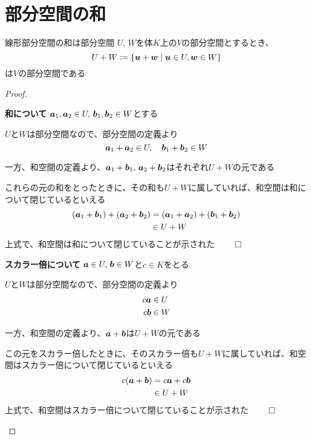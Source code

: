 \documentclass[../../../topic_linear-algebra]{subfiles}
\begin{document}
\sectionline
\section{部分空間の和}

\begin{theorem}{線形部分空間の和は部分空間}
  $U,\,W$を体$K$上の$V$の部分空間とするとき、
  \begin{equation*}
    U + W \coloneq \{ \vb*{u} + \vb*{w} \mid \vb*{u} \in U, \vb*{w} \in W \}
  \end{equation*}
  は$V$の部分空間である
\end{theorem}

\begin{proof}
  \begin{subpattern}{\bfseries 和について}
    $\vb*{a}_1, \vb*{a}_2 \in U, \, \vb*{b}_1, \vb*{b}_2 \in W$とする

    $U$と$W$は部分空間なので、部分空間の定義より
    \begin{equation*}
      \vb*{a}_1 + \vb*{a}_2 \in U, \quad \vb*{b}_1 + \vb*{b}_2 \in W
    \end{equation*}

    一方、和空間の定義より、$\vb*{a}_1 + \vb*{b}_1,\, \vb*{a}_2 + \vb*{b}_2$はそれぞれ$U+W$の元である

    これらの元の和をとったときに、その和も$U + W$に属していれば、和空間は和について閉じているといえる
    \begin{align*}
      (\vb*{a}_1 + \vb*{b}_1) + (\vb*{a}_2 + \vb*{b}_2) & = (\vb*{a}_1 + \vb*{a}_2) + (\vb*{b}_1 + \vb*{b}_2) \\
                                                        & \in U + W
    \end{align*}
    上式で、和空間は和について閉じていることが示された $\qed$
  \end{subpattern}

  \begin{subpattern}{\bfseries スカラー倍について}
    $\vb*{a} \in U, \, \vb*{b} \in W$と$c \in K$をとる

    $U$と$W$は部分空間なので、部分空間の定義より
    \begin{align*}
      c \vb*{a} & \in U \\
      c \vb*{b} & \in W
    \end{align*}

    一方、和空間の定義より、$\vb*{a} + \vb*{b}$は$U + W$の元である

    この元をスカラー倍したときに、そのスカラー倍も$U + W$に属していれば、和空間はスカラー倍について閉じているといえる
    \begin{align*}
      c(\vb*{a} + \vb*{b}) & = c \vb*{a} + c \vb*{b} \\
                           & \in U + W
    \end{align*}
    上式で、和空間はスカラー倍について閉じていることが示された $\qed$
  \end{subpattern}
\end{proof}
\end{document}
